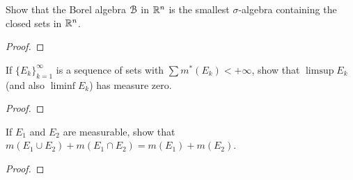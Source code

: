 \begin{problem}
  Show that the Borel algebra $\mathcal{B}$ in $\mathbb{R}^n$ is the smallest
  $\sigma$-algebra containing the closed sets in $\mathbb{R}^n$.
\end{problem}
\begin{proof}
\end{proof}

\begin{problem}
  If ${\{E_k\}}_{k=1}^\infty$ is a sequence of sets with
  $\sum m^*(E_k)<+\infty$, show that $\limsup E_k$ (and also $\liminf E_k$)
  has measure zero.
\end{problem}
\begin{proof}
\end{proof}

\begin{problem}
  If $E_1$ and $E_2$ are measurable, show that
  $m(E_1\cup E_2)+m(E_1\cap E_2)=m(E_1)+m(E_2)$.
\end{problem}
\begin{proof}
\end{proof}

